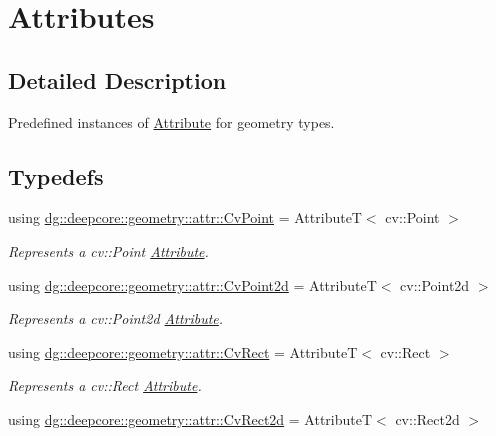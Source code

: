 \hypertarget{group___geometry_attributes}{}\section{Attributes}
\label{group___geometry_attributes}


\subsection{Detailed Description}
Predefined instances of \hyperlink{classdg_1_1deepcore_1_1_attribute}{Attribute} for geometry types. 

\subsection*{Typedefs}
\begin{DoxyCompactItemize}
\item 
using \hyperlink{group___geometry_attributes_ga01f1670ca2631504526d8a31da2c2dab}{dg\+::deepcore\+::geometry\+::attr\+::\+Cv\+Point} = AttributeT$<$ cv\+::\+Point $>$
\begin{DoxyCompactList}\small\item\em Represents a {\ttfamily cv\+::\+Point} \hyperlink{classdg_1_1deepcore_1_1_attribute}{Attribute}. \end{DoxyCompactList}\item 
using \hyperlink{group___geometry_attributes_ga5bf440b90d7f88552975a2ef0a793b29}{dg\+::deepcore\+::geometry\+::attr\+::\+Cv\+Point2d} = AttributeT$<$ cv\+::\+Point2d $>$
\begin{DoxyCompactList}\small\item\em Represents a {\ttfamily cv\+::\+Point2d} \hyperlink{classdg_1_1deepcore_1_1_attribute}{Attribute}. \end{DoxyCompactList}\item 
using \hyperlink{group___geometry_attributes_gaf468cd05b887ecf25a5cc5987699b696}{dg\+::deepcore\+::geometry\+::attr\+::\+Cv\+Rect} = AttributeT$<$ cv\+::\+Rect $>$
\begin{DoxyCompactList}\small\item\em Represents a {\ttfamily cv\+::\+Rect} \hyperlink{classdg_1_1deepcore_1_1_attribute}{Attribute}. \end{DoxyCompactList}\item 
using \hyperlink{group___geometry_attributes_ga27ad4b2d4055276ed4b3c849d0d8752f}{dg\+::deepcore\+::geometry\+::attr\+::\+Cv\+Rect2d} = AttributeT$<$ cv\+::\+Rect2d $>$

\end{DoxyCompactItemize}
